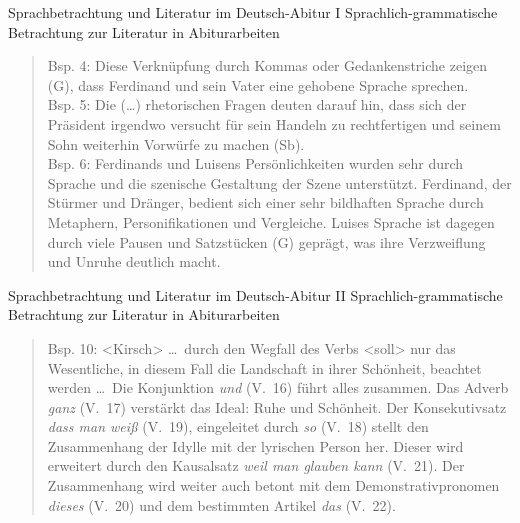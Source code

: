 \begin{frame}
  {Sprachbetrachtung und Literatur im Deutsch-Abitur I}
  \onslide<+->
  \onslide<+->
  Sprachlich-grammatische Betrachtung zur Literatur in Abiturarbeiten \\
  \Zeile
  \onslide<+->
  \begin{quote}
    Bsp. 4: Diese Verknüpfung durch Kommas oder Gedankenstriche zeigen (G), dass Ferdinand und sein Vater eine gehobene Sprache sprechen.\\
    \Zeile
    \onslide<+->
    Bsp. 5: Die (\ldots) rhetorischen Fragen deuten darauf hin, dass sich der Präsident irgendwo versucht für sein Handeln zu rechtfertigen und seinem Sohn weiterhin Vorwürfe zu machen (Sb).\\
    \Zeile
    \onslide<+->
    Bsp. 6: Ferdinands und Luisens Persönlichkeiten wurden sehr durch Sprache und die szenische Gestaltung der Szene unterstützt. Ferdinand, der Stürmer und Dränger, bedient sich einer sehr bildhaften Sprache durch Metaphern, Personifikationen und Vergleiche. Luises Sprache ist dagegen durch viele Pausen und Satzstücken (G) geprägt, was ihre Verzweiflung und Unruhe deutlich macht.
  \end{quote}
\end{frame}

\begin{frame}
  {Sprachbetrachtung und Literatur im Deutsch-Abitur II}
  \onslide<+->
  \onslide<+->
  Sprachlich-grammatische Betrachtung zur Literatur in Abiturarbeiten \\
  \Zeile
  \onslide<+->
  \begin{quote}
    Bsp. 10: <Kirsch> \ldots\ durch den Wegfall des Verbs <soll> nur das Wesentliche, in diesem Fall die Landschaft in ihrer Schönheit, beachtet werden \ldots\ Die Konjunktion \textit{und} (V.\ 16) führt alles zusammen. Das Adverb \textit{ganz} (V.\ 17) verstärkt das Ideal: Ruhe und Schönheit. Der Konsekutivsatz \textit{dass man weiß} (V.\ 19), eingeleitet durch \textit{so} (V.\ 18) stellt den Zusammenhang der Idylle mit der lyrischen Person her. Dieser wird erweitert durch den Kausalsatz \textit{weil man glauben kann} (V.\ 21). Der Zusammenhang wird weiter auch betont mit dem Demonstrativpronomen \textit{dieses} (V.\ 20) und dem bestimmten Artikel \textit{das} (V.\ 22). 
  \end{quote}
\end{frame}


